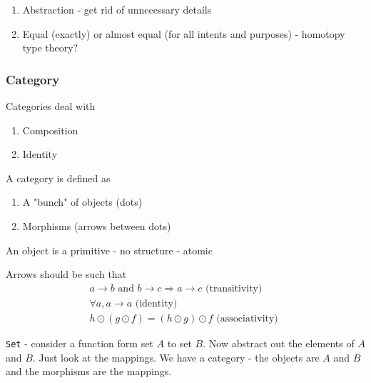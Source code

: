 \documentclass[titlepage, 12pt]{article}
\begin{document}
\begin{enumerate}
	\item Abstraction - get rid of unnecessary details
	\item Equal (exactly) or almost equal (for all intents and purposes) -
		homotopy type theory?
\end{enumerate}

\subsubsection{Category}
Categories deal with
\begin{enumerate}

	\item Composition

	\item Identity

\end{enumerate}

A category is defined as
\begin{enumerate}
	\item A "bunch" of objects (dots)
	\item Morphisms (arrows between dots)
\end{enumerate}

An object is a primitive - no structure - atomic

Arrows should be such that
\begin{gather*}
	a\rightarrow b \textrm{ and } b\rightarrow c \Rightarrow a\rightarrow
	c\textrm{ (transitivity) }\\
	\forall a, a\rightarrow a\textrm{ (identity) }\\
	h\odot(g\odot f) = (h\odot g)\odot f\textrm{ (associativity) }
\end{gather*}

\verb#Set# - consider a function form set $A$ to set $B$. Now abstract out the
elements of $A$ and $B$. Just look at the mappings. We have a category - the
objects are $A$ and $B$ and the morphisms are the mappings.
\end{document}
